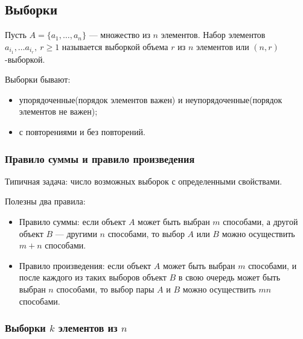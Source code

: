\subsection{Выборки}

\begin{defn}
    Пусть $A = \{a_1, \ldots, a_n\}$ --- множество из $n$ элементов. Набор элементов $a_{i_1}, \ldots a_{i_r},~r \geq 1$ называется выборкой объема $r$ из $n$ элементов или $(n, r)$-выборкой.
\end{defn}

Выборки бывают:
\begin{itemize}
    \item упорядоченные(порядок элементов важен) и неупорядоченные(порядок элементов не важен);
    \item с повторениями и без повторений.
\end{itemize}

\subsubsection*{Правило суммы и правило произведения}

Типичная задача: число возможных выборок с определенными свойствами.

Полезны два правила:

\begin{itemize}
    \item Правило суммы: если объект $A$ может быть выбран $m$ способами, а другой объект $B$ --- другими $n$ способами, то выбор $A$ или $B$ можно осуществить $m + n$ способами.
    \item Правило произведения: если объект $A$ может быть выбран $m$ способами, и после каждого из таких выборов объект $B$ в свою очередь может быть выбран $n$ способами, то выбор пары $A$ и $B$ можно осуществить $mn$ способами.
\end{itemize}

\subsubsection*{Выборки $k$ элементов из $n$}

